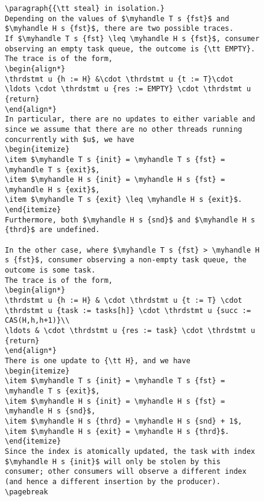 \documentclass[a4paper]{article}
\begin{document}
{\begin{figure}
\begin{lstlisting}
\paragraph{{\tt steal} in isolation.}
Depending on the values of $\myhandle T s {fst}$ and $\myhandle H s {fst}$, there are two possible traces.
If $\myhandle T s {fst} \leq \myhandle H s {fst}$, consumer observing an empty task queue, the outcome is {\tt EMPTY}.
The trace is of the form,
\begin{align*}
\thrdstmt u {h := H} &\cdot \thrdstmt u {t := T}\cdot \ldots \cdot \thrdstmt u {res := EMPTY} \cdot \thrdstmt u {return}
\end{align*}
In particular, there are no updates to either variable and since we assume that there are no other threads running concurrently with $u$, we have
\begin{itemize}
\item $\myhandle T s {init} = \myhandle T s {fst} = \myhandle T s {exit}$,
\item $\myhandle H s {init} = \myhandle H s {fst} = \myhandle H s {exit}$,
\item $\myhandle T s {exit} \leq \myhandle H s {exit}$.
\end{itemize}
Furthermore, both $\myhandle H s {snd}$ and $\myhandle H s {thrd}$ are undefined.

In the other case, where $\myhandle T s {fst} > \myhandle H s {fst}$, consumer observing a non-empty task queue, the outcome is some task.
The trace is of the form,
\begin{align*}
\thrdstmt u {h := H} & \cdot \thrdstmt u {t := T} \cdot \thrdstmt u {task := tasks[h]} \cdot \thrdstmt u {succ := CAS(H,h,h+1)}\\
\ldots & \cdot \thrdstmt u {res := task} \cdot \thrdstmt u {return}
\end{align*}
There is one update to {\tt H}, and we have
\begin{itemize}
\item $\myhandle T s {init} = \myhandle T s {fst} = \myhandle T s {exit}$,
\item $\myhandle H s {init} = \myhandle H s {fst} = \myhandle H s {snd}$,
\item $\myhandle H s {thrd} = \myhandle H s {snd} + 1$,
\item $\myhandle H s {exit} = \myhandle H s {thrd}$.
\end{itemize}
Since the index is atomically updated, the task with index $\myhandle H s {init}$ will only be stolen by this consumer; other consumers will observe a different index (and hence a different insertion by the producer).
\pagebreak


\end{lstlisting}
\end{figure}}
\end{document}
